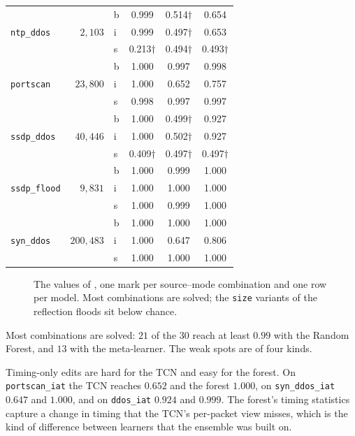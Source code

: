 \begin{table}[tp]
\begin{tabular}{lrl ccc}
\midrule
\multirow{3}{*}{\texttt{ntp\_ddos}} & \multirow{3}{*}{$2{,}103$}
 & b & 0.999 & 0.514$\dagger$ & 0.654 \\
 & & i & 0.999 & 0.497$\dagger$ & 0.653 \\
 & & s & 0.213$\dagger$ & 0.494$\dagger$ & 0.493$\dagger$ \\
\multirow{3}{*}{\texttt{portscan}} & \multirow{3}{*}{$23{,}800$}
 & b & 1.000 & 0.997 & 0.998 \\
 & & i & 1.000 & 0.652 & 0.757 \\
 & & s & 0.998 & 0.997 & 0.997 \\
\multirow{3}{*}{\texttt{ssdp\_ddos}} & \multirow{3}{*}{$40{,}446$}
 & b & 1.000 & 0.499$\dagger$ & 0.927 \\
 & & i & 1.000 & 0.502$\dagger$ & 0.927 \\
 & & s & 0.409$\dagger$ & 0.497$\dagger$ & 0.497$\dagger$ \\
\multirow{3}{*}{\texttt{ssdp\_flood}} & \multirow{3}{*}{$9{,}831$}
 & b & 1.000 & 0.999 & 1.000 \\
 & & i & 1.000 & 1.000 & 1.000 \\
 & & s & 1.000 & 0.999 & 1.000 \\
\multirow{3}{*}{\texttt{syn\_ddos}} & \multirow{3}{*}{$200{,}483$}
 & b & 1.000 & 1.000 & 1.000 \\
 & & i & 1.000 & 0.647 & 0.806 \\
 & & s & 1.000 & 1.000 & 1.000 \\
\bottomrule
\end{tabular}
\end{table}

\begin{figure}[t]
    \centering
    
    \caption[Per-source AUROC distribution.]{The values of ,
    one mark per source--mode combination and one row per model. Most combinations are
    solved; the \texttt{size} variants of the reflection floods sit below chance.}
    \label{fig:eval-persource}
\end{figure}

Most combinations are solved: $21$ of the $30$ reach at least $0.99$ with the Random
Forest, and $13$ with the meta-learner. The weak spots are of four kinds.

Timing-only edits are hard for the \ac{TCN} and easy for the forest. On
\texttt{portscan\_iat} the \ac{TCN} reaches $0.652$ and the forest $1.000$, on
\texttt{syn\_ddos\_iat} $0.647$ and $1.000$, and on \texttt{ddos\_iat} $0.924$ and
$0.999$. The forest's timing statistics capture a change in timing that the \ac{TCN}'s
per-packet view misses, which is the kind of difference between learners that the
ensemble was built on.

